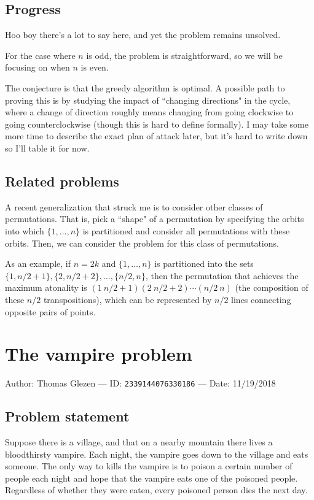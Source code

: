 \documentclass[10pt]{article}
\begin{document}
\subsection{Progress}

Hoo boy there's a lot to say here, and yet the problem remains unsolved.

For the case where $n$ is odd, the problem is straightforward, so we will be focusing on when $n$ is even.

The conjecture is that the greedy algorithm is optimal. A possible path to proving this is by studying the impact of ``changing directions" in the cycle, where a change of direction roughly means changing from going clockwise to going counterclockwise (though this is hard to define formally). I may take some more time to describe the exact plan of attack later, but it's hard to write down so I'll table it for now.

\subsection{Related problems}

A recent generalization that struck me is to consider other classes of permutations. That is, pick a ``shape" of a permutation by specifying the orbits into which $\{1,\ldots,n\}$ is partitioned and consider all permutations with these orbits. Then, we can consider the problem for this class of permutations.

As an example, if $n=2k$ and $\{1,\ldots,n\}$ is partitioned into the sets $\{1,n/2+1\},\{2,n/2+2\},\ldots,\{n/2,n\}$, then the permutation that achieves the maximum atonality is $(1\ n/2+1)(2\ n/2+2)\cdots (n/2\ n)$ (the composition of these $n/2$ transpositions), which can be represented by $n/2$ lines connecting opposite pairs of points.

\pagebreak

\section{The vampire problem}

Author: Thomas Glezen --- ID: \verb`2339144076330186` --- Date: 11/19/2018

\subsection{Problem statement}

Suppose there is a village, and that on a nearby mountain there lives a bloodthirsty vampire. Each night, the vampire goes down to the village and eats someone. The only way to kills the vampire is to poison a certain number of people each night and hope that the vampire eats one of the poisoned people. Regardless of whether they were eaten, every poisoned person dies the next day.
\end{document}
